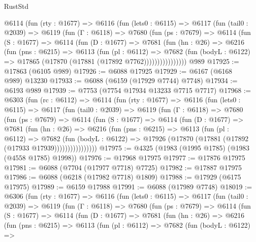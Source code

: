 \begin{lexlean}{RustStd}
\begin{coremodule}
      @6114
        (fun (rty : @1677) =>
        @6116
          (fun (lets0 : @6115) =>
          @6117
            (fun (tail0 : @2039) =>
            @6119
              (fun (Γ : @6118) =>
              @7680
                (fun (ps : @7679) =>
                @6114
                  (fun (S : @1677) =>
                  @6114
                    (fun (D : @1677) =>
                    @7681
                      (fun (hn : @26) =>
                      @6216
                        (fun (pns : @6215) =>
                        @6113
                          (fun (pl : @6112) =>
                          @7682
                            (fun (bodyL : @6122) =>
                            @17865 (@17870 (@17881 (@17892 @7762))))))))))))))))
    @989
@17925 := @17863 (@6105 @989)
@17926 := @6088 @17925
@17929 := @6167 (@6168 @989) @13230
@17933 := @6088 (@6159 (@17929 @7744) @7748)
@17934 := @6193 @989
@17939 := @7753 (@7754 @17934 @13233 @7715 @7717)
@17968 := @6303
    (fun (rc : @6112) =>
    @6114
      (fun (rty : @1677) =>
      @6116
        (fun (lets0 : @6115) =>
        @6117
          (fun (tail0 : @2039) =>
          @6119
            (fun (Γ : @6118) =>
            @7680
              (fun (ps : @7679) =>
              @6114
                (fun (S : @1677) =>
                @6114
                  (fun (D : @1677) =>
                  @7681
                    (fun (hn : @26) =>
                    @6216
                      (fun (pns : @6215) =>
                      @6113
                        (fun (pl : @6112) =>
                        @7682
                          (fun (bodyL : @6122) =>
                          @17926 (@17870 (@17881 (@17892 (@17933 @17939))))))))))))))))
@17975 := @4325 (@1983 (@1995 @1785) (@1983 (@4558 @1785) @1998))
@17976 := @17968 @17975
@17977 := @17876 @17975
@17981 := @6088 (@7704 (@17977 @7718) @7725)
@17982 := @17887 @17975
@17986 := @6088 (@6218 (@17982 @7718) @1809)
@17988 := @17929 (@6175 @17975)
@17989 := @6159 @17988
@17991 := @6088 (@17989 @7748)
@18019 := @6306
    (fun (rty : @1677) =>
    @6116
      (fun (lets0 : @6115) =>
      @6117
        (fun (tail0 : @2039) =>
        @6119
          (fun (Γ : @6118) =>
          @7680
            (fun (ps : @7679) =>
            @6114
              (fun (S : @1677) =>
              @6114
                (fun (D : @1677) =>
                @7681
                  (fun (hn : @26) =>
                  @6216
                    (fun (pns : @6215) =>
                    @6113
                      (fun (pl : @6112) =>
                      @7682
                        (fun (bodyL : @6122) =>

\end{coremodule}
\end{lexlean}
